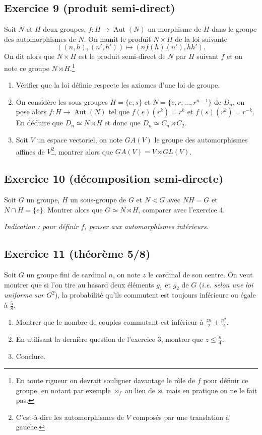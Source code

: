 \documentclass[11pt,a4paper]{article}
\newcommand{\normal}{\mathrel{\triangleleft}}
\newcommand{\semi}{\rtimes}
\begin{document}
\subsection*{Exercice 9 (produit semi-direct)}
Soit $N$ et $H$ deux groupes, $f:H\to\operatorname{Aut}(N)$ un morphisme de $H$ dans le groupe des automorphismes de $N$. On munit le produit $N\times H$ de la loi suivante
\[
  ((n,h),(n',h'))\mapsto (n f(h)(n'),hh').
\]
On dit alors que $N\times H$ est le produit semi-direct de $N$ par $H$ suivant $f$ et on note ce groupe $N\semi H$.\footnote{En toute rigueur on devrait souligner davantage le rôle de $f$ pour définir ce groupe, en notant par exemple $\semi_f$ au lieu de $\semi$, mais en pratique on ne le fait pas.}
\begin{enumerate}
  \item Vérifier que la loi définie respecte les axiomes d'une loi de groupe.
  \item On considère les sous-groupes $H=\{e,s\}$ et $N=\{e,r,\ldots,r^{n-1}\}$ de $D_n$, on pose alors $f:H\to\operatorname{Aut}(N)$ tel que $f(e)(r^k)=r^k$ et $f(s)(r^k)=r^{-k}$. En déduire que $D_n\simeq N\semi H$ et donc que $D_n\simeq C_n\semi C_2$.
  \item Soit $V$ un espace vectoriel, on note $GA(V)$ le groupe des automorphismes affines de $V$\footnote{C'est-à-dire les automorphismes de $V$ composés par une translation à gauche.}, montrer alors que $GA(V)=V\semi GL(V)$.
\end{enumerate}

\subsection*{Exercice 10 (décomposition semi-directe)}
Soit $G$ un groupe, $H$ un sous-groupe de $G$ et $N\normal G$ avec $NH=G$ et $N\cap H=\{e\}$. Montrer alors que $G\simeq N\semi H$, comparer avec l'exercice 4.

\emph{Indication : pour définir $f$, penser aux automorphismes intérieurs.}

\subsection*{Exercice 11 (théorème 5/8)}
Soit $G$ un groupe fini de cardinal $n$, on note $z$ le cardinal de son centre. On veut montrer que si l'on tire au hasard deux éléments $g_1$ et $g_2$ de $G$ (\emph{i.e. selon une loi uniforme sur $G^2$}), la probabilité qu'ils commutent est toujours inférieure ou égale à $\frac58$.
\begin{enumerate}
  \item Montrer que le nombre de couples commutant est inférieur à $\frac{zn}{2}+\frac{n^2}{2}$.
  \item En utilisant la dernière question de l'exercice 3, montrer que $z\leq \frac n4$.
  \item Conclure.
\end{enumerate}
\end{document}
